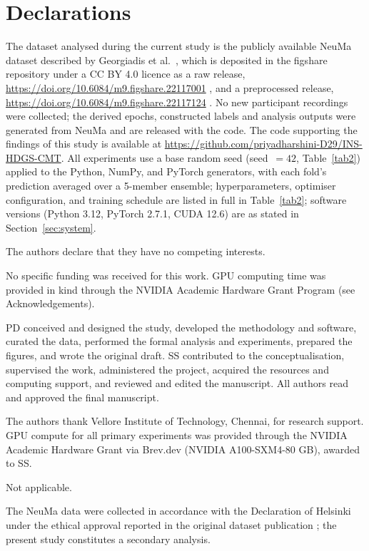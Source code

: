 \section*{Declarations}

The dataset analysed during the current study is the publicly available NeuMa dataset described by Georgiadis et al.\ \cite{ref35}, which is deposited in the figshare repository under a CC BY 4.0 licence as a raw release, \url{https://doi.org/10.6084/m9.figshare.22117001} \cite{ref59}, and a preprocessed release, \url{https://doi.org/10.6084/m9.figshare.22117124} \cite{ref60}. No new participant recordings were collected; the derived epochs, constructed labels and analysis outputs were generated from NeuMa and are released with the code. The code supporting the findings of this study is available at \url{https://github.com/priyadharshini-D29/INS-HDGS-CMT}. All experiments use a base random seed (seed~$=42$, Table~\ref{tab2}) applied to the Python, NumPy, and PyTorch generators, with each fold's prediction averaged over a 5-member ensemble; hyperparameters, optimiser configuration, and training schedule are listed in full in Table~\ref{tab2}; software versions (Python 3.12, PyTorch 2.7.1, CUDA 12.6) are as stated in Section~\ref{sec:system}.

The authors declare that they have no competing interests.

No specific funding was received for this work. GPU computing time was provided in kind through the NVIDIA Academic Hardware Grant Program (see Acknowledgements).

PD conceived and designed the study, developed the methodology and software, curated the data, performed the formal analysis and experiments, prepared the figures, and wrote the original draft. SS contributed to the conceptualisation, supervised the work, administered the project, acquired the resources and computing support, and reviewed and edited the manuscript. All authors read and approved the final manuscript.

The authors thank Vellore Institute of Technology, Chennai, for research support. GPU compute for all primary experiments was provided through the NVIDIA Academic Hardware Grant via Brev.dev (NVIDIA A100-SXM4-80 GB), awarded to SS.

Not applicable.

The NeuMa data were collected in accordance with the Declaration of Helsinki under the ethical approval reported in the original dataset publication \cite{ref35}; the present study constitutes a secondary analysis.

